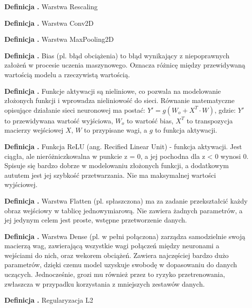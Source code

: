 \noindent
\textbf{Definicja \mlDefinitionIndex.}
\incrementMlDefinitionIndex
Warstwa Rescaling

\noindent
\textbf{Definicja \mlDefinitionIndex.}
\incrementMlDefinitionIndex
Warstwa Conv2D

\noindent
\textbf{Definicja \mlDefinitionIndex.}
\incrementMlDefinitionIndex
Warstwa MaxPooling2D

\noindent
\textbf{Definicja \mlDefinitionIndex.}
\incrementMlDefinitionIndex
Bias (pl. błąd obciążenia) to błąd wynikający z niepoprawnych założeń w procesie uczenia maszynowego.
Oznacza różnicę między przewidywaną wartością modelu a rzeczywistą wartością.

\noindent
\textbf{Definicja \mlDefinitionIndex.}
\incrementMlDefinitionIndex
Funkcje aktywacji są nieliniowe, co pozwala na modelowanie złożonych funkcji i wprowadza nieliniowość do sieci.
Równanie matematyczne opisujące działanie sieci neuronowej ma postać: $Y' = g(W_o + X^T \cdot W)$, gdzie:
$Y'$ to przewidywana wartość wyjściowa,
$W_o$ to wartość bias,
$X^T$ to transpozycja macierzy wejściowej $X$,
$W$ to przypisane wagi,
a $g$ to funkcja aktywacji.

\noindent
\textbf{Definicja \mlDefinitionIndex.}
\incrementMlDefinitionIndex
Funkcja ReLU (ang. Recified Linear Unit) - funkcja aktywacji.
Jest ciągła, ale nieróżniczkowalna w punkcie z = 0, a jej pochodna dla z < 0 wynosi 0.
Spisuje się bardzo dobrze w modelowaniu złożonych funkcji, a dodatkowym aututem jest jej szybkość przetwarzania.
Nie ma maksymalnej wartości wyjściowej.

\noindent
\textbf{Definicja \mlDefinitionIndex.}
\incrementMlDefinitionIndex
Warstwa Flatten (pl. spłaszczona) ma za zadanie przekształcić każdy obraz wejściowy w tablicę jednowymiarową.
Nie zawiera żadnych parametrów, a jej jedynym celem jest proste, wstępne przetworzenie danych.

\noindent
\textbf{Definicja \mlDefinitionIndex.}
\incrementMlDefinitionIndex
Warstwa Dense (pl. w pełni połączona) zarządza samodzielnie swoją macierzą wag,
zawierającą wszystkie wagi połączeń między neuronami a wejściami do nich, oraz wekorem obciążeń.
Zawiera najczęściej bardzo dużo parametrów, dzięki czemu model uzyskuje swobodę w dopasowaniu do danych uczących.
Jednocześnie, grozi mu również przez to ryzyko przetrenowania,
zwłaszcza w przypadku korzystania z mniejszych zestawów danych.

\noindent
\textbf{Definicja \mlDefinitionIndex.}
\incrementMlDefinitionIndex
Regularyzacja L2

